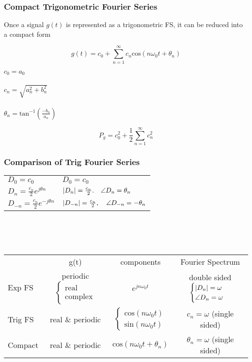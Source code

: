 \documentclass[11pt]{article}
\DeclarePairedDelimiter{\abs}{\lvert}{\rvert}
\begin{document}
\subsubsection{Compact Trigonometric Fourier Series}
Once a signal $g(t)$ is represented as a trigonometric FS, it can be reduced into a compact form

$$g(t) = c_0 + \sum_{n=1}^{\infty}c_n\text{cos}(n\omega_0t + \theta_n)$$

$c_0 = a_0$ \\ \\
$c_n = \sqrt{a_n^2 + b_n^2}$ \\ \\
$\theta_n = \text{tan}^{-1}(\frac{-b_n}{a_n})$

$$P_g = c_0^2 + \frac{1}{2}\sum_{n=1}^{\infty}c^2_n$$

\subsubsection{Comparison of Trig Fourier Series}

\begin{tabular}{l l}
 $D_0 = c_0$ & $D_0 = c_0$ \\
 $D_n = \frac{c_n}{2}e^{j\theta n}$ & $\abs{D_n} = \frac{c_n}{2}. \quad \angle D_n = \theta_n$ \\
 $D_{-n} = \frac{c_n}{2}e^{-j\theta n}$ & $\abs{D_{-n}} = \frac{c_n}{2}, \quad \angle D_{-n} = -\theta_n$
\end{tabular}
\\ \\ \\
\begin{tabular} {| l | c | c | c |}
& g(t) & components & Fourier Spectrum \\
Exp FS & periodic $\begin{cases}
    \text{real} \\ 
    \text{complex}
\end{cases}$ & $e^{jn\omega_0t}$ & double sided $\begin{cases}
    \abs{D_n} = \omega \\
    \angle{D_n} = \omega 
\end{cases} $\\
Trig FS & real \& periodic & $\begin{cases}
    \text{cos}(n\omega_0t)\\
    \text{sin}(n\omega_0t)
\end{cases}$ & $c_n = \omega$ (single sided) \\
Compact & real \& periodic & $\text{cos}(n\omega_0t + \theta_n)$ & $\theta_n = \omega$ (single sided)
\end{tabular}
\end{document}
